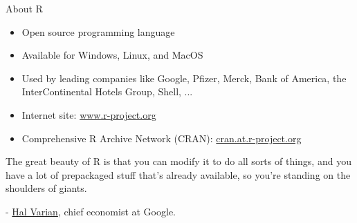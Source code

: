 \documentclass[aspectratio=169]{beamer}
\begin{document}
\begin{frame}{About R}
\begin{itemize}
    \item Open source programming language
    \item Available for Windows, Linux, and MacOS
    \item Used by leading companies like Google, Pfizer, Merck, Bank of America, the
InterContinental Hotels Group, Shell, ... 
    \item Internet site: \url{www.r-project.org}
    \item Comprehensive R Archive Network (CRAN): \url{cran.at.r-project.org}
\end{itemize}
\vspace{0.2cm}

    \begin{center}
        \begin{tcolorbox}[enhanced,sharp corners,
            width=14.8cm,
            colback=white,
            overlay={
                \node[anchor=north west,fill=white,draw=white,circle,inner sep=1pt] 
                at ([xshift=-0.17cm,yshift=0.2cm]frame.north west) {\faQuoteLeft};
                \node[anchor=south east,fill=white,draw=white,circle,inner sep=1pt] 
                at ([xshift=0.17cm,yshift=-0.2cm]frame.south east) {\faQuoteRight};
            }
            ]
            The great beauty of R is that you can modify it to do all sorts of things, and you have a lot of prepackaged stuff that’s already available, so you’re standing on the shoulders of giants. \\
            \vspace{0cm}

            {\small - \href{https://www.nytimes.com/2009/01/07/technology/business-computing/07program.html}{Hal Varian}, chief economist at
Google.}
        \end{tcolorbox}
    \end{center}
\end{frame}
\end{document}
